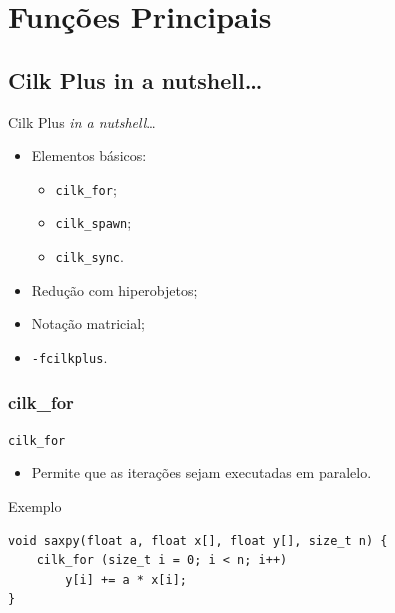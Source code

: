 \documentclass{beamer}
\begin{document}
\section{Funções Principais}
\subsection{Cilk Plus in a nutshell\ldots}
\begin{frame}{Cilk Plus \textit{in a nutshell}\ldots}
\begin{itemize}
    \item Elementos básicos:
    \begin{itemize}
        \item \texttt{cilk\_for};
        \item \texttt{cilk\_spawn};
        \item \texttt{cilk\_sync}.
    \end{itemize}
    \item Redução com hiperobjetos;
    \item Notação matricial;
    \item \texttt{-fcilkplus}.
\end{itemize}
\end{frame}
\subsubsection{cilk\_for}
\begin{frame}[fragile]{\texttt{cilk\_for}}
\begin{itemize}
    \item Permite que as iterações sejam executadas em paralelo.
\end{itemize}
\begin{block}{Exemplo}
\begin{lstlisting}
void saxpy(float a, float x[], float y[], size_t n) {
    cilk_for (size_t i = 0; i < n; i++)
        y[i] += a * x[i];
}
\end{lstlisting}
\end{block}
\end{frame}
\end{document}
